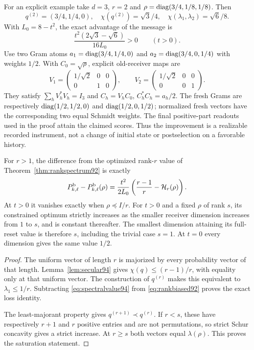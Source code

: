 For an explicit example take $d=3$, $r=2$ and
$\rho=\operatorname{diag}(3/4,1/8,1/8)$.  Then
\[
 q^{(2)}=(3/4,1/4,0),\quad
 \chi(q^{(2)})=\sqrt3/4,\quad
 \chi(\lambda_1,\lambda_2)=\sqrt6/8.
\]
With $L_0=8-t^2$, the exact advantage of the message is
\begin{equation}\label{eq:messageexample94}
 \frac{t^2(2\sqrt3-\sqrt6)}{16L_0}>0\qquad(t>0).
\end{equation}
Use two Gram atoms
$a_1=\operatorname{diag}(3/4,1/4,0)$ and $a_2=\operatorname{diag}(3/4,0,1/4)$ with
weights $1/2$.  With $C_0=\sqrt\rho$, explicit old-receiver maps are
\[
 V_1=\begin{pmatrix}1/\sqrt2&0&0\\0&1&0\end{pmatrix},\qquad
 V_2=\begin{pmatrix}1/\sqrt2&0&0\\0&0&1\end{pmatrix}.
\]
They satisfy $\sum_hV_h^*V_h=I_3$ and
$C_h=V_hC_0$, $C_h^*C_h=a_h/2$.
The fresh Grams are respectively
$\operatorname{diag}(1/2,1/2,0)$ and $\operatorname{diag}(1/2,0,1/2)$; normalized fresh
vectors have the corresponding two equal Schmidt weights.  The final
positive-part readouts used in the proof attain the claimed scores.
Thus the improvement is a realizable recorded instrument, not a
change of initial state or postselection on a favorable history.

\begin{corollary}\label{cor:spectralsaturation94}
For $r>1$, the difference from the optimized rank-$r$ value of
Theorem~\ref{thm:rankspectrum92} is exactly
\begin{equation}\label{eq:exactspectralloss94}
 P_{k,\ell}^{\rm b}-P_{k,\ell}^{\rm b}(\rho)
       =\frac{t^2}{2L_0}\left(\frac{r-1}{r}-\mathcal H_r(\rho)\right).
\end{equation}
At $t>0$ it vanishes exactly when $\rho\preceq I/r$.
For $t>0$ and a fixed $\rho$ of rank $s$, its constrained optimum strictly
increases as the smaller receiver dimension increases from $1$ to
$s$, and is constant thereafter.  The smallest dimension attaining
its full-reset value is therefore $s$, including the trivial case
$s=1$.  At $t=0$ every dimension gives the same value $1/2$.
\end{corollary}
\begin{proof}
The uniform vector of length $r$ is majorized by every probability
vector of that length.  Lemma~\ref{lem:secular94} gives
$\chi(q)\le(r-1)/r$, with equality only at that uniform vector.
The construction of $q^{(r)}$ makes this equivalent to
$\lambda_1\le1/r$.  Subtracting \eqref{eq:spectralvalue94} from
\eqref{eq:rankbiased92} proves the exact loss identity.

The least-majorant property gives
$q^{(r+1)}\prec q^{(r)}$.  If $r<s$, these have respectively $r+1$
and $r$ positive entries and are not permutations, so strict Schur
concavity gives a strict increase.  At $r\ge s$ both vectors equal
$\lambda(\rho)$.  This proves the saturation statement.
\end{proof}

